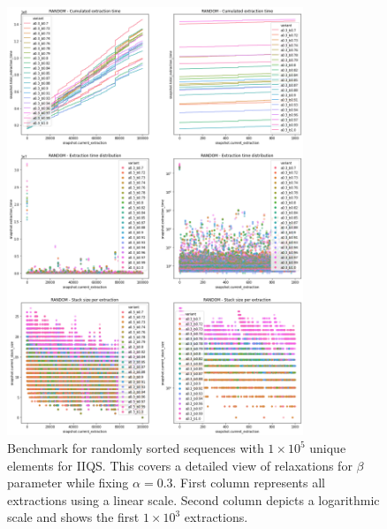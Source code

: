 \begin{figure}[!ht]
    \centering
    \includegraphics[width=0.79\textwidth]{./fragments/04_experimental_execution/images/04_alphabeta_detail_random_right.png}
    \caption{Benchmark for randomly sorted sequences with $1\times10^5$ unique elements for IIQS. This covers a detailed view of relaxations for $\beta$ parameter while fixing $\alpha=0.3$.  First column represents all extractions using a linear scale. Second column depicts a logarithmic scale and shows the first $1\times10^3$ extractions. }
    \label{FIG:05_ALPHABETA_BENCHMARK_RANDOM_RIGHT}
\end{figure}

